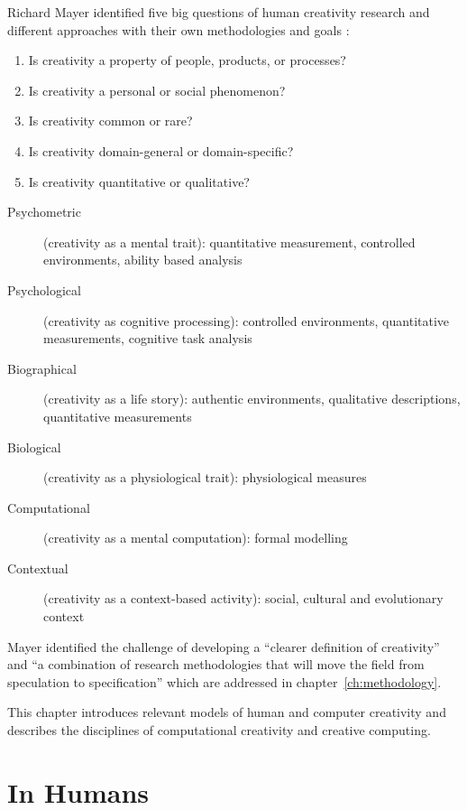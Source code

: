 Richard Mayer identified five big questions of human creativity research and different approaches with their own methodologies and goals \citeyear[p.450-451,453]{Mayer1999}:

\label{s:Mayer5questions}
\begin{enumerate}
  \item Is creativity a property of people, products, or processes?
  \item Is creativity a personal or social phenomenon?
  \item Is creativity common or rare?
  \item Is creativity domain-general or domain-specific?
  \item Is creativity quantitative or qualitative?
\end{enumerate}

\begin{description}
  \item [Psychometric] (creativity as a mental trait): quantitative measurement, controlled environments, ability based analysis
  \item [Psychological] (creativity as cognitive processing): controlled environments, quantitative measurements, cognitive task analysis
  \item [Biographical] (creativity as a life story): authentic environments, qualitative descriptions, quantitative measurements
  \item [Biological] (creativity as a physiological trait): physiological measures
  \item [Computational] (creativity as a mental computation): formal modelling
  \item [Contextual] (creativity as a context-based activity): social, cultural and evolutionary context
\end{description}

Mayer identified the challenge of developing a ``clearer definition of creativity'' and ``a combination of research methodologies that will move the field from speculation to specification'' \citeyear[p.459]{Mayer1999} which are addressed in chapter~\ref{ch:methodology}.

This chapter introduces relevant models of human and computer creativity and describes the disciplines of computational creativity and creative computing.


\section{In Humans}

